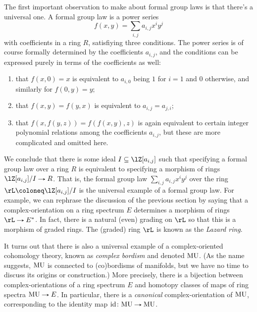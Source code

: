 \begin{nothing}
  \label{chrom-univfgl}
  The first important observation to make about formal group laws is
  that there's a universal one. A formal group law is a power series
  \[
  f(x,y) = \sum_{i,j} a_{i,j} x^i y^j
  \]
  with coefficients in a ring $R$, satisfiying three conditions. The
  power series is of course formally determined by the coefficients
  $a_{i,j}$, and the conditions can be expressed purely in terms of
  the coefficients as well:
  \begin{enumerate}
  \item that $f(x,0) = x$ is equivalent to $a_{i,0}$ being $1$ for
    $i = 1$ and $0$ otherwise, and similarly for $f(0,y) = y$;
  \item that $f(x,y) = f(y,x)$ is equivalent to $a_{i,j} = a_{j,i}$;
  \item that $f(x,f(y,z)) = f(f(x,y),z)$ is again equivalent to
    certain integer polynomial relations among the coefficients
    $a_{i,j}$, but these are more complicated and omitted here.
  \end{enumerate}
  We conclude that there is some ideal $I \subseteq \lZ[a_{i,j}]$ such
  that specifying a formal group law over a ring $R$ is equivalent to
  specifying a morphism of rings $\lZ[a_{i,j}]/I \to R$. That is, the
  formal group law $\sum_{i,j} a_{i,j} x^i y^j$ over the ring
  $\rL \ce \lZ[a_{i,j}]/I$ is the universal example of a formal group
  law. For example, we can rephrase the discussion of the previous
  section by saying that a complex-orientation on a ring spectrum $E$
  determines a morphism of rings $\rL \to E^*$. In fact, there is a
  natural (even) grading on $\rL$ so that this is a morphism of graded
  rings. The (graded) ring $\rL$ is known as the \emph{Lazard ring}.
\end{nothing}

\begin{nothing}
  \label{chrom-mu}
  It turns out that there is also a universal example of a
  complex-oriented cohomology theory, known as \emph{complex bordism}
  and denoted $\mathrm{MU}$. (As the name suggests, $\mathrm{MU}$ is connected to
  (co)bordisms of manifolds, but we have no time to discuss its
  origins or construction.) More precisely, there is a bijection
  between complex-orientations of a ring spectrum $E$ and homotopy
  classes of maps of ring spectra $\MU \to E$. In particular, there is
  a \emph{canonical} complex-orientation of $\mathrm{MU}$, corresponding to
  the identity map $\id \c \MU \to \MU$.
\end{nothing}

